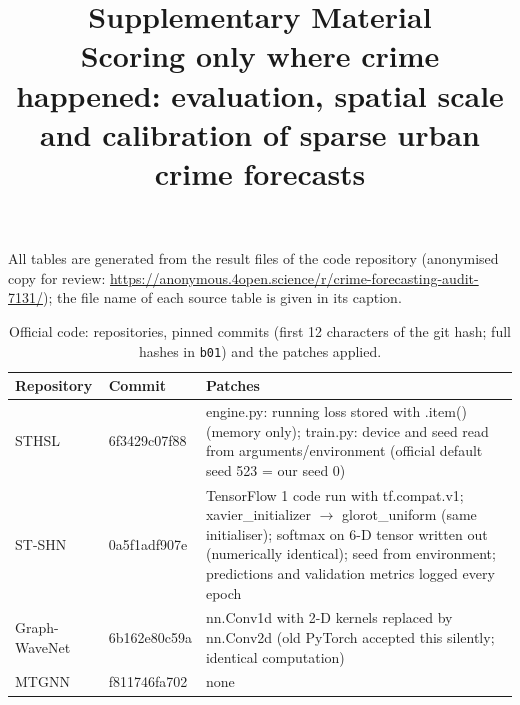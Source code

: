 \documentclass[11pt]{article}
\title{Supplementary Material\\[4pt]\large Scoring only where crime happened: evaluation, spatial scale and calibration of sparse urban crime forecasts}
\author{}\date{}
\begin{document}
\maketitle
All tables are generated from the result files of the code repository (anonymised copy for review: \url{https://anonymous.4open.science/r/crime-forecasting-audit-7131/}); the file name of each source table is given in its caption.
\begin{table}[H]\centering\scriptsize\setlength{\tabcolsep}{3pt}
\caption{Official code: repositories, pinned commits (first 12 characters of the git hash; full hashes in \texttt{b01}) and the patches applied.}\label{tab:s1}
\begin{tabularx}{\linewidth}{>{\raggedright\arraybackslash}p{2.2cm}>{\raggedright\arraybackslash}p{3.2cm}>{\raggedright\arraybackslash}X}\toprule
Repository & Commit & Patches\\\midrule
STHSL & 6f3429c07f88 & engine.py: running loss stored with .item() (memory only); train.py: device and seed read from arguments/environment (official default seed 523 = our seed 0) \\
ST-SHN & 0a5f1adf907e & TensorFlow 1 code run with tf.compat.v1; xavier\_initializer $\rightarrow$ glorot\_uniform (same initialiser); softmax on 6-D tensor written out (numerically identical); seed from environment; predictions and validation metrics logged every epoch \\
Graph-WaveNet & 6b162e80c59a & nn.Conv1d with 2-D kernels replaced by nn.Conv2d (old PyTorch accepted this silently; identical computation) \\
MTGNN & f811746fa702 & none \\
\bottomrule\end{tabularx}\end{table}
\end{document}
